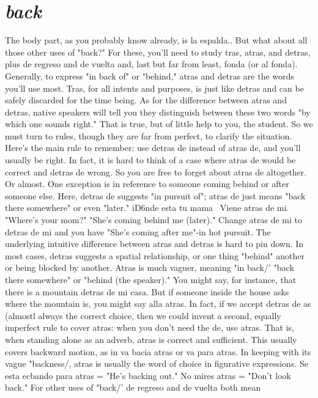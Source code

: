 \documentclass[14pt,a4paper,oneside]{memoir}
\begin{document}
\section{\emph{back}}

The body part, as you probably know already, is la espalda..
But what about all those other uses of "back?" For these, you'll need
to study tras, atras, and detras, plus de regreso and de vuelta and, last
but far from least, fonda (or al fonda).
Generally, to express "in back of" or "behind," atras and detras are the words you'll use most. Tras, for all intents and purposes, is
just like detras and can be safely discarded for the time being. As for
the difference between atras and detras, native speakers will tell you
they distinguish between these two words "by which one sounds right."
That is true, but of little help to you, the student. So we must turn to
rules, though they are far from perfect, to clarify the situation.
Here's the main rule to remember: use detras de instead of
atras de, and you'll usually be right. In fact, it is hard to think of a case
where atras de would be correct and detras de wrong. So you are free
to forget about atras de altogether. Or almost. One exception is in reference to someone coming behind or after someone else. Here, detras
de suggests "in pursuit of"; atras de just means "back there somewhere" or even "later." iD6nde esta tu mama~ Viene atras de mi.
"Where's your mom?" "She's coming behind me (later)." Change atras
de mi to detras de mi and you have "She's coming after me"-in
hot pursuit.
The underlying intuitive difference between atras and detras
is hard to pin down. In most cases, detras suggests a spatial relationship, or one thing "behind" another or being blocked by another. Atras
is much vaguer, meaning "in back/' "back there somewhere" or "behind (the speaker)." You might say, for instance, that there is a mountain detras de mi casa. But if someone inside the house asks where the
mountain is, you might say alla atras.
In fact, if we accept detras de as (almostl always the correct
choice, then we could invent a second, equally imperfect rule to cover
atras: when you don't need the de, use atras. That is, when standing
alone as an adverb, atras is correct and sufficient. This usually covers
backward motion, as in va bacia atras or va para atras. In keeping
with its vague "backness/, atras is usually the word of choice in figurative expressions. Se esta ecbando para atras = "He's backing out."
No mires atras = "Don't look back."
For other uses of "back/' de regreso and de vuelta both mean
\end{document}
